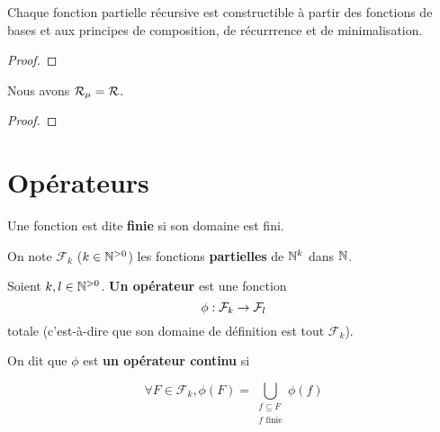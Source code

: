 \begin{corollary}
	Chaque fonction partielle récursive est constructible à partir des fonctions de bases
	et aux principes de composition, de récurrrence et de minimalisation.
\end{corollary}

\ifdefined\outputproof
\begin{proof}

\end{proof}
\fi

\begin{theorem}
	Nous avons $\mathcal{R}_{\mu} = \mathcal{R}$.
\end{theorem}

\ifdefined\outputproof
\begin{proof}

\end{proof}
\fi

\section{Opérateurs}




\begin{definition} 
	Une fonction est dite \textbf{finie} si son domaine est fini.
\end{definition}

\begin{notation}
	On note $\mathcal{F}_{k}$ ($k \in \mathbb{N}^{> 0}$) les fonctions
	\textbf{partielles} de $\mathbb{N}^{k}$ dans $\mathbb{N}$.
\end{notation}

\begin{definition} [Opérateur]
	Soient $k, l \in \mathbb{N}^{> 0}$.
	\textbf{Un opérateur} est une fonction
	\begin{equation}
		\phi : \mathcal{F}_{k} \rightarrow \mathcal{F}_{l}
	\end{equation}
totale (c'est-à-dire que son domaine de définition est tout
	$\mathcal{F}_{k}$).

	On dit que $\phi$ est \textbf{un opérateur continu} si

	\begin{equation*}
		\forall F \in \mathcal{F}_{k}, \phi(F) = \displaystyle \bigcup_{\substack{f \subseteq
			F \\ f \text{ finie}}} \phi(f)
	\end{equation*}
\end{definition}

